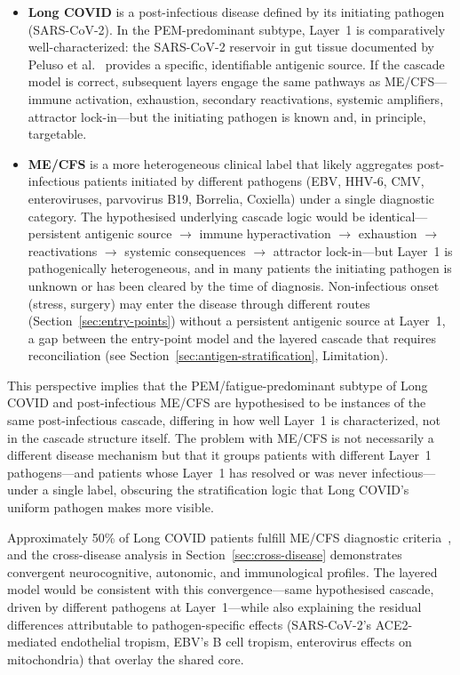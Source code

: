 \begin{itemize}
    \item \textbf{Long COVID} is a post-infectious disease defined by its initiating pathogen (SARS-CoV-2). In the PEM-predominant subtype, Layer~1 is comparatively well-characterized: the SARS-CoV-2 reservoir in gut tissue documented by Peluso et al.~\cite{Peluso2024pet} provides a specific, identifiable antigenic source. If the cascade model is correct, subsequent layers engage the same pathways as ME/CFS---immune activation, exhaustion, secondary reactivations, systemic amplifiers, attractor lock-in---but the initiating pathogen is known and, in principle, targetable.
    \item \textbf{ME/CFS} is a more heterogeneous clinical label that likely aggregates post-infectious patients initiated by different pathogens (EBV, HHV-6, CMV, enteroviruses, parvovirus B19, Borrelia, Coxiella) under a single diagnostic category. The hypothesised underlying cascade logic would be identical---persistent antigenic source $\rightarrow$ immune hyperactivation $\rightarrow$ exhaustion $\rightarrow$ reactivations $\rightarrow$ systemic consequences $\rightarrow$ attractor lock-in---but Layer~1 is pathogenically heterogeneous, and in many patients the initiating pathogen is unknown or has been cleared by the time of diagnosis. Non-infectious onset (stress, surgery) may enter the disease through different routes (Section~\ref{sec:entry-points}) without a persistent antigenic source at Layer~1, a gap between the entry-point model and the layered cascade that requires reconciliation (see Section~\ref{sec:antigen-stratification}, Limitation).\end{itemize}

This perspective implies that the PEM/fatigue-predominant subtype of Long COVID and post-infectious ME/CFS are hypothesised to be instances of the same post-infectious cascade, differing in how well Layer~1 is characterized, not in the cascade structure itself. The problem with ME/CFS is not necessarily a different disease mechanism but that it groups patients with different Layer~1 pathogens---and patients whose Layer~1 has resolved or was never infectious---under a single label, obscuring the stratification logic that Long COVID's uniform pathogen makes more visible.

Approximately 50\% of Long COVID patients fulfill ME/CFS diagnostic criteria~\cite{Wong2021LongCOVIDMECFS}, and the cross-disease analysis in Section~\ref{sec:cross-disease} demonstrates convergent neurocognitive, autonomic, and immunological profiles. The layered model would be consistent with this convergence---same hypothesised cascade, driven by different pathogens at Layer~1---while also explaining the residual differences attributable to pathogen-specific effects (SARS-CoV-2's ACE2-mediated endothelial tropism, EBV's B cell tropism, enterovirus effects on mitochondria) that overlay the shared core.

